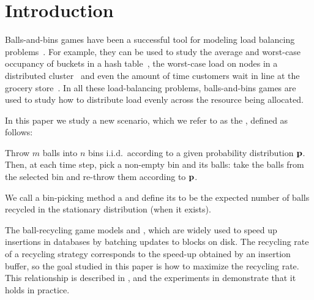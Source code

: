 
\section{Introduction}

Balls-and-bins games have been a successful tool for modeling load balancing
problems~\cite{DBLP:journals/tpds/Mitzenmacher01,DBLP:conf/stoc/AdlerCMR95,DBLP:conf/esa/AdlerBS98,DBLP:journals/siamcomp/AzarBKU99,DBLP:conf/random/ColeFMMRSU98,DBLP:conf/stoc/ColeMHMRSSV98,DBLP:journals/rsa/CzumajS01,DBLP:conf/focs/Mitzenmacher96,DBLP:journals/mst/Mitzenmacher99,DBLP:journals/jacm/Vocking03,DBLP:journals/rsa/BringmannSSS16,DBLP:journals/algorithmica/Park17,WestZaWa16,DBLP:journals/talg/Farach-ColtonFM09,DBLP:conf/icalp/ConwayFS18}.
For example, they can be used to study the average and worst-case occupancy of
buckets in a hash table~\cite{DBLP:journals/corr/abs-0901-1155}, the
worst-case load on nodes in a distributed
cluster~\cite{PetrovaOlMa10,DBLP:conf/podc/BerenbrinkFKMNW16} and even the amount
of time customers wait in line at the grocery store~\cite{DBLP:journals/mst/Mitzenmacher99}.  In
all these load-balancing problems, balls-and-bins games are used to study how
to distribute load evenly across the resource being allocated.

In this paper we study a new scenario, which we refer to as the
, defined as follows:
\begin{displayquote}
	Throw $m$ balls into $n$ bins i.i.d.\ according to a given probability
	distribution $\mathbf{p}$.  Then, at each time step, pick a non-empty bin and
	 its balls: take the balls from the selected bin and re-throw
	them according to $\mathbf{p}$.
\end{displayquote}
We call a bin-picking method a  and define its
 to be the expected number of balls recycled in the
stationary distribution (when it exists).

The ball-recycling game models  and , which are widely used to speed up insertions in databases by batching
updates to blocks on disk. The recycling rate of a recycling strategy
corresponds to the speed-up obtained by an insertion buffer, so the goal
studied in this paper is how to maximize the recycling rate. This relationship
is described in , and the experiments in
 demonstrate that it holds in practice.

